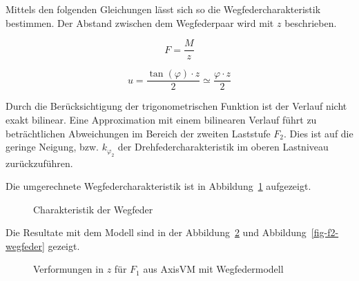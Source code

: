 \documentclass[
  11pt,
  letterpaper,
]{scrreprt}
\begin{document}
Mittels den folgenden Gleichungen lässt sich so die
Wegfedercharakteristik bestimmen. Der Abstand zwischen dem Wegfederpaar
wird mit \(z\) beschrieben.

\[
F = \frac{M}{z}
\]

\[
u = \frac{\tan(\varphi) \cdot z}{2} \simeq \frac{\varphi \cdot z}{2}
\]

Durch die Berücksichtigung der trigonometrischen Funktion ist der
Verlauf nicht exakt bilinear. Eine Approximation mit einem bilinearen
Verlauf führt zu beträchtlichen Abweichungen im Bereich der zweiten
Laststufe \(F_2\). Dies ist auf die geringe Neigung, bzw.
\(k_{\varphi_2}\) der Drehfedercharakteristik im oberen Lastniveau
zurückzuführen.

Die umgerechnete Wegfedercharakteristik ist in
Abbildung~\ref{fig-wegfeder-force} aufgezeigt.

\begin{figure}[H]


\caption{\label{fig-wegfeder-force}Charakteristik der Wegfeder}

\end{figure}%

Die Resultate mit dem Modell sind in der Abbildung~\ref{fig-f1-wegfeder}
und Abbildung~\ref{fig-f2-wegfeder} gezeigt.

\begin{figure}[H]


\caption{\label{fig-f1-wegfeder}Verformungen in \(z\) für \(F_1\) aus
AxisVM mit Wegfedermodell}

\end{figure}%
\end{document}
